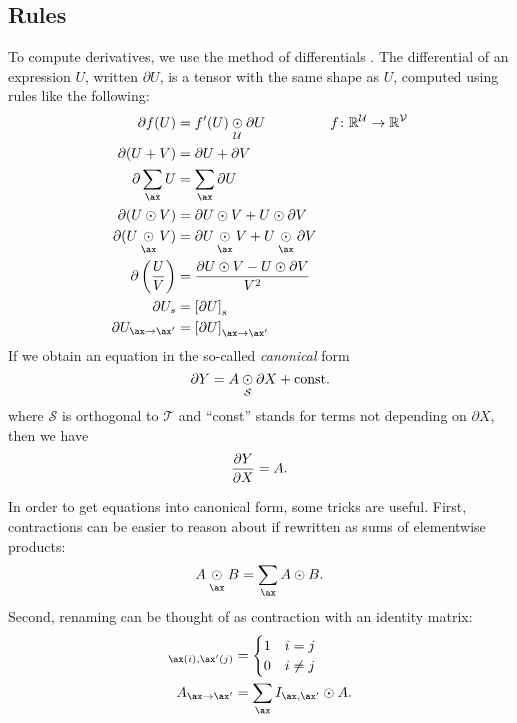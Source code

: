 \subsection{Rules}

To compute derivatives, we use the method of differentials \citep{magnus+neudecker:1985}. The differential of an expression $U$, written $\partial U$, is a tensor with the same shape as $U$, computed using rules like the following:
\begin{align*}
  \partial f(U) &= f'(U) \ndot{\mathcal{U}} \partial U && f \colon \reals^\mathcal{U} \rightarrow \reals^{\mathcal{V}} \\
  \partial (U + V) &= \partial U + \partial V \\
  \partial \nsum{\ax} U &= \nsum{\ax} \partial U \\
  \partial (U \odot V) &= \partial U \odot V + U \odot \partial V \\
  \partial (U \ndot{\ax} V) &= \partial U \ndot{\ax} V + U \ndot{\ax} \partial V \\
  \partial \left(\frac{U}{V}\right) &= \frac{\partial U \odot V - U \odot \partial V}{V^2} \\
  \partial U_s &= \left[\partial U\right]_s \\
  \partial U_{\ax\rightarrow\ax'} &= \left[\partial U\right]_{\ax\rightarrow\ax'}
\end{align*}
If we obtain an equation in the so-called \emph{canonical} form
\begin{equation*}
  \partial Y = A \ndot{\mathcal{S}} \partial X + \text{const.}
\end{equation*}
where $\mathcal{S}$ is orthogonal to $\mathcal{T}$ and ``const'' stands for terms not depending on $\partial X$, then we have
\begin{equation*}
  \frac{\partial Y}{\partial X} = A.
\end{equation*}

In order to get equations into canonical form, some tricks are useful. First, contractions can be easier to reason about if rewritten as sums of elementwise products:
\[ A \ndot{\ax} B = \nsum{\ax} A \odot B. \]
Second, renaming can be thought of as contraction with an identity matrix:
\begin{align*}
[I_{\ax,\ax'}]_{\ax(i),\ax'(j)} &= \begin{cases} 1 & i = j \\ 0 & i \neq j \end{cases} \\
A_{\ax\rightarrow\ax'} &= \nsum{\ax} I_{\ax,\ax'} \odot A.
\end{align*}

